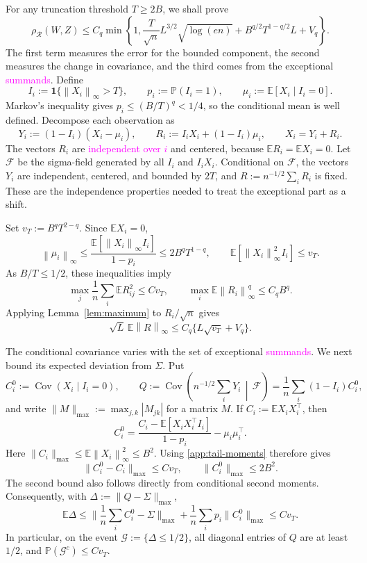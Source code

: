 \documentclass[11pt,letterpaper]{article}
\theoremstyle{remark}
\newcommand{\E}{\mathbb E}
\newcommand{\Pp}{\mathbb P}
\newcommand{\Cov}{\operatorname{Cov}}
\newcommand{\norm}[1]{\left\lVert#1\right\rVert}
\newcommand{\maxnorm}[1]{\lVert#1\rVert_{\max}}
\newcommand{\rh}{\rho_{\mathcal R}}
\newcommand{\ind}{\mathbf 1}
\begin{document}
For any truncation threshold \(T\ge2B\), we shall prove
\begin{equation}
 \rh(W,Z)\le C_q\min\left\{1,
 \frac{T}{\sqrt n}L^{3/2}\sqrt{\log(en)}
 +B^{q/2}T^{1-q/2}L+V_q\right\}.
 \label{poly:threshold}
\end{equation}
The first term measures the error for the bounded component, the
second measures the change in covariance, and the third comes from
the exceptional \textcolor{magenta}{summands}. Define
\[
 I_i:=\ind\{\norm{X_i}_\infty>T\},\qquad
 p_i:=\Pp(I_i=1),\qquad \mu_i:=\E[X_i\mid I_i=0].
\]
Markov's inequality gives \(p_i\le(B/T)^q<1/4\), so the conditional
mean is well defined. Decompose each observation as
\begin{equation}
 Y_i:=(1-I_i)(X_i-\mu_i),\qquad
 R_i:=I_iX_i+(1-I_i)\mu_i,\qquad X_i=Y_i+R_i.
 \label{app:decomposition}
\end{equation}
The vectors \(R_i\) are \textcolor{magenta}{independent over \(i\)} and centered, because
\(\E R_i=\E X_i=0\). Let \(\mathcal F\) be the sigma-field generated
by all \(I_i\) and \(I_iX_i\). Conditional on \(\mathcal F\), the
vectors \(Y_i\) are independent, centered, and bounded by \(2T\),
and \(R:=n^{-1/2}\sum_iR_i\) is fixed. These are the independence
properties needed to treat the exceptional part as a shift.

Set \(v_T:=B^qT^{2-q}\). Since \(\E X_i=0\),
\begin{equation}
 \norm{\mu_i}_\infty
 \le\frac{\E[\norm{X_i}_\infty I_i]}{1-p_i}
 \le2B^qT^{1-q},\qquad
 \E[\norm{X_i}_\infty^2 I_i]\le v_T.
 \label{app:tail-moments}
\end{equation}
As \(B/T\le1/2\), these inequalities imply
\[
 \max_j\frac1n\sum_i\E R_{ij}^2\le C v_T,\qquad
 \max_i\E\norm{R_i}_\infty^q\le C_qB^q.
\]
Applying Lemma~\ref{lem:maximum} to \(R_i/\sqrt n\) gives
\begin{equation}
 \sqrt L\,\E\norm R_\infty
 \le C_q\{L\sqrt{v_T}+V_q\}.
 \label{app:shift}
\end{equation}

The conditional covariance varies with the set of exceptional \textcolor{magenta}{summands}.
We next bound its expected deviation from \(\Sigma\). Put
\[
 C_i^0:=\Cov(X_i\mid I_i=0),\qquad
 Q:=\Cov\left(n^{-1/2}\sum_iY_i\,\middle|\,\mathcal F\right)
   =\frac1n\sum_i(1-I_i)C_i^0,
\]
and write \(\maxnorm M:=\max_{j,k}|M_{jk}|\) for a matrix \(M\).
If \(C_i:=\E X_iX_i^\top\), then
\[
 C_i^0=\frac{C_i-\E[X_iX_i^\top I_i]}{1-p_i}
          -\mu_i\mu_i^\top.
\]
Here \(\maxnorm{C_i}\le\E\norm{X_i}_\infty^2\le B^2\).
Using \eqref{app:tail-moments} therefore gives
\[
 \maxnorm{C_i^0-C_i}\le C v_T,
 \qquad \maxnorm{C_i^0}\le2B^2.
\]
The second bound also follows directly from conditional second moments.
Consequently, with \(\Delta:=\maxnorm{Q-\Sigma}\),
\begin{equation}
 \E\Delta
 \le\maxnorm{\frac1n\sum_i C_i^0-\Sigma}
       +\frac1n\sum_i p_i\maxnorm{C_i^0}
 \le C v_T.
 \label{app:conditional-covariance}
\end{equation}
In particular, on the event \(\mathcal G:=\{\Delta\le1/2\}\), all
diagonal entries of \(Q\) are at least \(1/2\), and
\(\Pp(\mathcal G^c)\le C v_T\).
\end{document}
